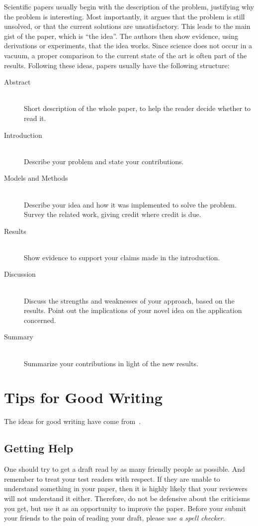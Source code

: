 \documentclass[10pt,conference,compsocconf]{IEEEtran}
\begin{document}
Scientific papers usually begin with the description of the problem,
justifying why the problem is interesting. Most importantly, it argues
that the problem is still unsolved, or that the current solutions are
unsatisfactory. This leads to the main gist of the paper, which is
``the idea''. The authors then show evidence, using derivations or
experiments, that the idea works. Since science does not occur in a
vacuum, a proper comparison to the current state of the art is often
part of the results. Following these ideas, papers usually have the
following structure:
\begin{description}
\item[Abstract] \ \\
  Short description of the whole paper, to help the
  reader decide whether to read it.
\item[Introduction] \ \\
  Describe your problem and state your
  contributions.
\item[Models and Methods] \ \\
  Describe your idea and how it was implemented to solve
  the problem. Survey the related work, giving credit where credit is
  due.
\item[Results] \ \\
  Show evidence to support your claims made in the
  introduction.
\item[Discussion] \ \\
  Discuss the strengths and weaknesses of your
  approach, based on the results. Point out the implications of your
  novel idea on the application concerned.
\item[Summary] \ \\
  Summarize your contributions in light of the new
  results.
\end{description}


\section{Tips for Good Writing}
\label{sec:tips-writing}

The ideas for good writing have come
from~\cite{editor10,jones08,anderson04}.

\subsection{Getting Help}
One should try to get a draft read by as many friendly people as
possible. And remember to treat your test readers with respect. If
they are unable to understand something in your paper, then it is
highly likely that your reviewers will not understand it
either. Therefore, do not be defensive about the criticisms you get,
but use it as an opportunity to improve the paper. Before your submit
your friends to the pain of reading your draft, please \emph{use a
  spell checker}.
\end{document}
